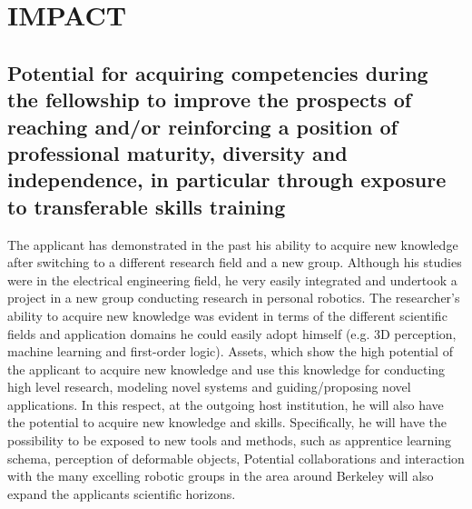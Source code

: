 \section{IMPACT} %
\label{sec:impact}
\subsection{Potential for acquiring competencies during the fellowship to improve the prospects of 
reaching and/or reinforcing a position of professional maturity, diversity and independence, 
in particular through exposure to transferable skills training}
The applicant has demonstrated in the past his ability
to acquire new knowledge after switching to a different research field
and  a  new  group.  Although  his  studies  were  in  the  electrical
engineering field,  he very easily integrated and  undertook a project
in  a  new  group   conducting  research  in  personal  robotics.  The
researcher's ability to  acquire new knowledge was evident  in terms of
the  different  scientific fields  and  application  domains he  could
easily  adopt  himself  (e.g.  3D  perception,  machine  learning  and
first-order  logic). Assets,  which  show the  high  potential of  the
applicant  to  acquire  new  knowledge  and  use  this  knowledge  for
conducting   high   level  research,   modeling   novel  systems   and
guiding/proposing novel applications. In this respect, at the outgoing
host  institution, he  will also  have  the potential  to acquire  new
knowledge and skills. Specifically, he will have the possibility to be
exposed to new tools and  methods, such as apprentice learning schema,
perception  of   deformable  objects,  Potential   collaborations  and
interaction with the many excelling  robotic groups in the area around
Berkeley will also expand the applicants scientific horizons.
 
